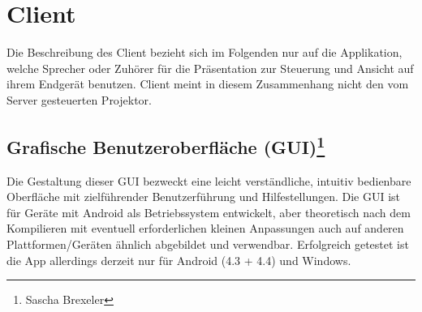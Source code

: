 \chapter[Client]{Client}
\thispagestyle{fancy}
\label{client}

Die Beschreibung des Client bezieht sich im Folgenden nur auf die Applikation, welche Sprecher oder Zuhörer für die Präsentation zur Steuerung und Ansicht auf ihrem Endgerät benutzen. Client meint in diesem Zusammenhang nicht den vom Server gesteuerten Projektor.

\section[Grafische Benutzeroberfläche (GUI)]{Grafische Benutzeroberfläche (GUI)\footnote{Sascha Brexeler}}
\label{GUI}
Die Gestaltung dieser GUI bezweckt eine leicht verständliche, intuitiv bedienbare Oberfläche mit zielführender Benutzerführung und Hilfestellungen.
Die GUI ist für Geräte mit Android als Betriebssystem entwickelt, aber theoretisch nach dem Kompilieren mit eventuell erforderlichen kleinen Anpassungen auch auf anderen Plattformen/Geräten ähnlich abgebildet und verwendbar. Erfolgreich getestet ist die App allerdings derzeit nur für Android (4.3 + 4.4) und Windows.


